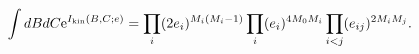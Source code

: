 \begin{equation}
\int dBdC{\rm e}^{I_{{\rm {kin}}}(B,C;e)}=\prod_{i}(2e_{i})^{M_{i}(M_{i}-1)}%
\prod_{i}(e_{i})^{4M_{0}M_{i}}\prod_{i<j}(e_{ij})^{2M_{i}M_{j}}.
\end{equation}

